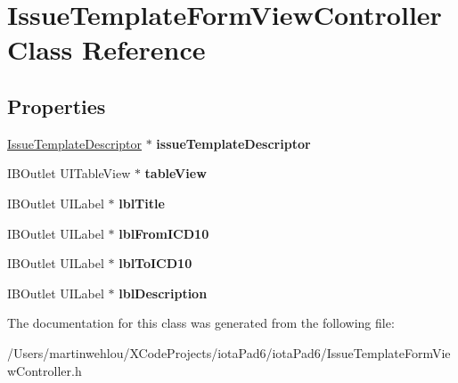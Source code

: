 \hypertarget{interface_issue_template_form_view_controller}{
\section{IssueTemplateFormViewController Class Reference}
\label{interface_issue_template_form_view_controller}
}
\subsection*{Properties}
\begin{DoxyCompactItemize}
\item 
\hypertarget{interface_issue_template_form_view_controller_a82b0634f35b2a9ad00aee0fd629ada77}{
\hyperlink{interface_issue_template_descriptor}{IssueTemplateDescriptor} $\ast$ {\bfseries issueTemplateDescriptor}}
\label{interface_issue_template_form_view_controller_a82b0634f35b2a9ad00aee0fd629ada77}

\item 
\hypertarget{interface_issue_template_form_view_controller_a58032af4b701ea48ac8bc25f62f1d7b5}{
IBOutlet UITableView $\ast$ {\bfseries tableView}}
\label{interface_issue_template_form_view_controller_a58032af4b701ea48ac8bc25f62f1d7b5}

\item 
\hypertarget{interface_issue_template_form_view_controller_a416321d589b4fd25635c84cd58ec624f}{
IBOutlet UILabel $\ast$ {\bfseries lblTitle}}
\label{interface_issue_template_form_view_controller_a416321d589b4fd25635c84cd58ec624f}

\item 
\hypertarget{interface_issue_template_form_view_controller_a45148f98236ca2fdd2d273cabf22fcd0}{
IBOutlet UILabel $\ast$ {\bfseries lblFromICD10}}
\label{interface_issue_template_form_view_controller_a45148f98236ca2fdd2d273cabf22fcd0}

\item 
\hypertarget{interface_issue_template_form_view_controller_ae7d2154a7705984f9876f7c4c9c8dc68}{
IBOutlet UILabel $\ast$ {\bfseries lblToICD10}}
\label{interface_issue_template_form_view_controller_ae7d2154a7705984f9876f7c4c9c8dc68}

\item 
\hypertarget{interface_issue_template_form_view_controller_ac82af377e335258c6b6e99bbf2d31b2f}{
IBOutlet UILabel $\ast$ {\bfseries lblDescription}}
\label{interface_issue_template_form_view_controller_ac82af377e335258c6b6e99bbf2d31b2f}

\end{DoxyCompactItemize}


The documentation for this class was generated from the following file:\begin{DoxyCompactItemize}
\item 
/Users/martinwehlou/XCodeProjects/iotaPad6/iotaPad6/IssueTemplateFormViewController.h\end{DoxyCompactItemize}
